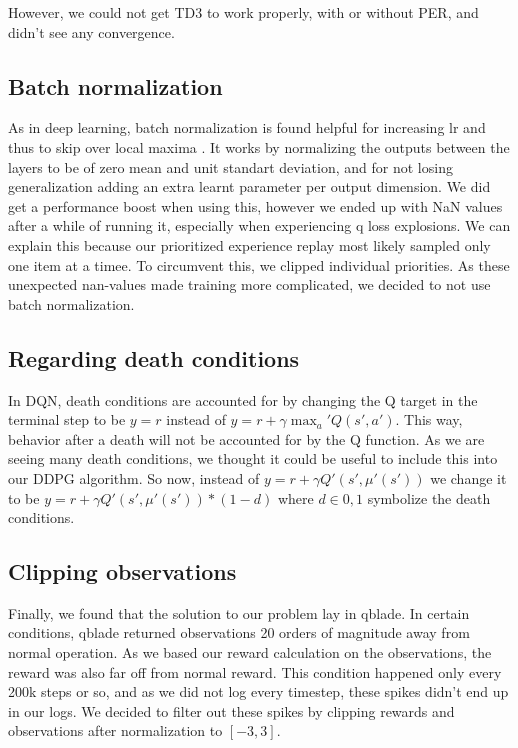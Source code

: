 \documentclass[hyperref,beleg]{cgvpub}
\begin{document}
However, we could not get \ac{TD3} to work properly, with or without \ac{PER}, and didn't see any convergence.

\subsection{Batch normalization}
As in deep learning, batch normalization is found helpful for increasing lr and thus to skip over local maxima \cite{bjorckUnderstandingBatchNormalization}. It works by normalizing the outputs between the layers to be of zero mean and unit standart deviation, and for not losing generalization adding an extra learnt parameter per output dimension. We did get a performance boost when using this, however we ended up with NaN values after a while of running it, especially when experiencing q loss explosions. We can explain this because our prioritized experience replay most likely sampled only one item at a timee. To circumvent this, we clipped individual priorities. As these unexpected nan-values made training more complicated, we decided to not use batch normalization.

\subsection{Regarding death conditions}

In \ac{DQN}, death conditions are accounted for by changing the Q target in the terminal step to be $y = r$ instead of $y = r + \gamma \max_a' Q(s', a')$. This way, behavior after a death will not be accounted for by the Q function. As we are seeing many death conditions, we thought it could be useful to include this into our DDPG algorithm. So now, instead of $y = r + \gamma Q'(s', \mu'(s'))$ we change it to be $y = r + \gamma Q'(s', \mu'(s')) * (1-d)$ where $d \in {0, 1}$ symbolize the death conditions.

\subsection{Clipping observations}

Finally, we found that the solution to our problem lay in qblade. In certain conditions, qblade returned observations 20 orders of magnitude away from normal operation. As we based our reward calculation on the observations, the reward was also far off from normal reward. This condition happened only every 200k steps or so, and as we did not log every timestep, these spikes didn't end up in our logs. We decided to filter out these spikes by clipping rewards and observations after normalization to $[-3, 3]$.
\end{document}
